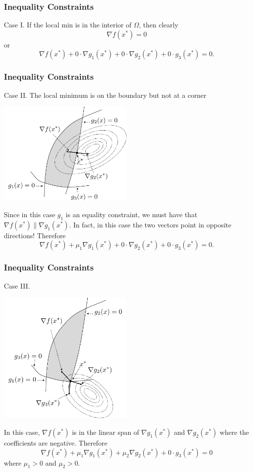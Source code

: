 \documentclass{beamer}
\begin{document}
\begin{frame}\frametitle{Inequality Constraints}
	{\color{blue}Case I.}
	If the local min is in the interior of $\Omega$, then clearly
	\[ 
		\nabla f(x^{\ast}) = 0 
	\]
	or
	\[ 
		\nabla f(x^{\ast}) 
			+ 0 \cdot \nabla g_1(x^{\ast}) 
			+ 0 \cdot \nabla g_2(x^{\ast}) 
			+ 0 \cdot g_3(x^{\ast}) = 0.
	\]
\end{frame}

\begin{frame}\frametitle{Inequality Constraints}
	{\color{blue}Case II.}
	The local minimum is on the boundary but not at a corner
	\begin{center}
		\includegraphics[width=0.5\textwidth]
			{figures/chap18_gradient_of_g}
	\end{center}
	Since in this case $g_1$  is an equality constraint, we must have that $\nabla f(x^{\ast}) \parallel \nabla g_1(x^{\ast})$.  In fact, in this case the two vectors point in opposite directions!  Therefore
	\[
		\nabla f(x^{\ast}) + \mu_1 \nabla g_1(x^{\ast}) + 0\cdot \nabla g_2(x^{\ast}) + 0\cdot g_3 (x^{\ast}) = 0.
	\]	
\end{frame}

\begin{frame}\frametitle{Inequality Constraints}
	{\color{blue}Case III.}
		
	\begin{center}
		\includegraphics[width=0.5\textwidth]
			{figures/chap18_two_inequality_constraints}
	\end{center}
	In this case, $\nabla f(x^{\ast})$ is in the linear span of $\nabla g_1(x^{\ast})$ and $\nabla g_2(x^{\ast})$ where the coefficients are negative.  Therefore
	\[ 
		\nabla f(x^{\ast}) 
			+ \mu_1 \nabla g_1(x^{\ast}) 
			+ \mu_2 \nabla g_2 (x^{\ast}) 
			+ 0\cdot g_3 (x^{\ast}) = 0 
	\]
	where $\mu_1 > 0$ and $\mu_2 > 0$.
\end{frame}
\end{document}
